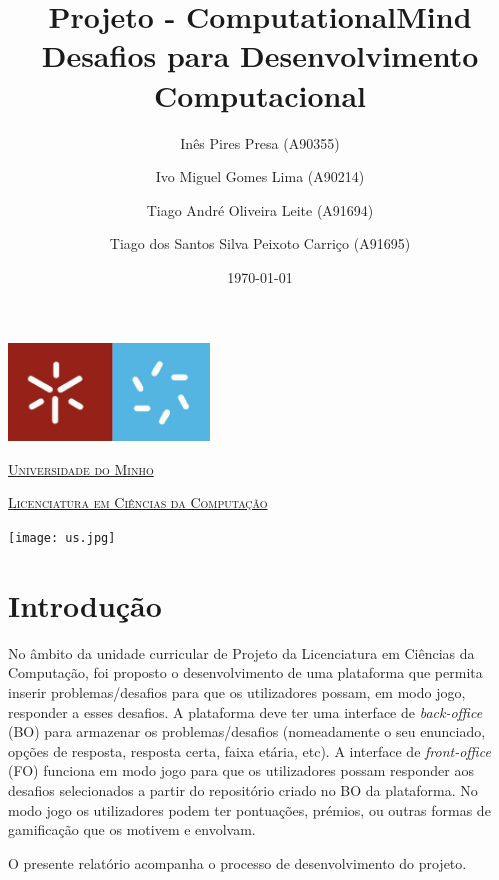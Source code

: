 \documentclass[11pt,a4paper]{report}
\title{Projeto - ComputationalMind\\ Desafios para Desenvolvimento  Computacional} %
\author{Inês Pires Presa (A90355)\and Ivo Miguel Gomes Lima (A90214)\and Tiago André Oliveira Leite (A91694)\and Tiago dos Santos Silva Peixoto Carriço (A91695)} %
\date{\today} %
\begin{document}
\clearpage
\thispagestyle{empty}

  \begin{minipage}{0.9\linewidth}
        \centering
    \includegraphics[width=0.4\textwidth]{um.jpeg}\par\vspace{1cm}
                \href{https://www.uminho.pt/PT}
    {\scshape\LARGE Universidade do Minho} \par
    \vspace{0.6cm}
                \href{https://lcc.di.uminho.pt}
    {\scshape\Large Licenciatura em Ciências da Computação} \par
    \maketitle
    \begin{center}
      \texttt{[image: us.jpg]}
\end{center}
  \end{minipage}

\tableofcontents %

\chapter{Introdução}

No âmbito da unidade curricular de Projeto da Licenciatura em Ciências da Computação, foi proposto o desenvolvimento de uma plataforma que permita inserir problemas/desafios para que os utilizadores possam, em modo jogo, responder a esses desafios. A plataforma deve ter uma interface de \emph{back-office} (BO) para armazenar os problemas/desafios (nomeadamente o seu enunciado, opções de resposta, resposta certa, faixa etária, etc). 
A interface de \emph{front-office} (FO) funciona em modo jogo para que os utilizadores possam responder aos desafios selecionados a partir do repositório criado no BO da plataforma. No modo jogo os utilizadores podem ter pontuações, prémios, ou outras formas de gamificação que os motivem e envolvam. \par
O presente relatório acompanha o processo de desenvolvimento do projeto.
\end{document}
